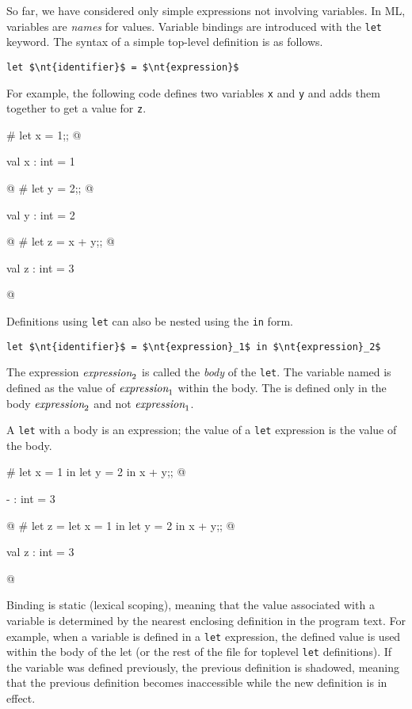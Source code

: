 
So far, we have considered only simple expressions not involving
variables.  In ML, variables are \emph{names} for values.
Variable bindings are introduced with the \hbox{\hbox{\lstinline/let/}} keyword.
The syntax of a simple top-level definition is as follows.
\label{keyword:let}
\label{literal:lident}

\begin{center}
\lstinline!let $\nt{identifier}$ = $\nt{expression}$!
\end{center}
%
For example, the following code defines two variables \hbox{\lstinline/x/}
and \hbox{\lstinline/y/} and adds them together to get a value
for \hbox{\lstinline/z/}.

\begin{ocaml}
# let x = 1;;
@
\begin{topoutput}
val x : int = 1
\end{topoutput}
@
# let y = 2;;
@
\begin{topoutput}
val y : int = 2
\end{topoutput}
@
# let z = x + y;;
@
\begin{topoutput}
val z : int = 3
\end{topoutput}
@
\end{ocaml}
%
Definitions using \hbox{\lstinline/let/} can also be nested using the
\hbox{\lstinline/in/} form.
\label{keyword:in}

\begin{center}
\lstinline/let $\nt{identifier}$ = $\nt{expression}_1$ in $\nt{expression}_2$/
\end{center}
%
The expression $\textit{\rmfamily expression}_2$ is called the \emph{body} of the
\hbox{\hbox{\lstinline/let/}}.  The variable named  is
defined as the value of $\textit{\rmfamily expression}_1$ within the body.  The
 is defined only in the body $\textit{\rmfamily expression}_2$ and
not $\textit{\rmfamily expression}_1$.

A \hbox{\lstinline/let/} with a body is an expression; the value of a \hbox{\lstinline/let/}
expression is the value of the body.

\begin{ocaml}
# let x = 1 in
  let y = 2 in
     x + y;;
@
\begin{topoutput}
- : int = 3
\end{topoutput}
@
# let z =
     let x = 1 in
     let y = 2 in
        x + y;;
@
\begin{topoutput}
val z : int = 3
\end{topoutput}
@
\end{ocaml}
%
Binding is static (lexical scoping), meaning that the value associated
with a variable is determined by the nearest enclosing definition in
the program text.  For example, when a variable is defined in a
\hbox{\lstinline/let/} expression, the defined value is used within the body of
the let (or the rest of the file for toplevel \hbox{\lstinline/let/} definitions).
If the variable was defined previously, the previous definition is shadowed,
meaning that the previous definition becomes inaccessible while the new definition is in effect.

